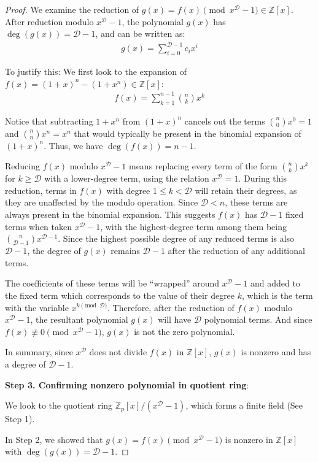 \documentclass{article}
\theoremstyle{plain}
\theoremstyle{definition}
\newcommand{\D}{\mathcal{D}}
\begin{document}
\begin{proof}
We examine the reduction of $g(x) = f(x) \pmod{x^{\D}-1} \in \mathbb{Z}[x]$. After reduction modulo $x^\D - 1$, the polynomial $g(x)$ has $\deg(g(x)) = \D-1$, and can be written as:
\begin{align}
    g(x) = \sum_{i=0}^{\D-1} c_i x^i
\end{align}

To justify this: We first look to the expansion of  $f(x) = (1 + x)^n - (1 + x^n) \in \mathbb{Z}[x]$:
\begin{align}
    f(x) = \sum_{k=1}^{n-1} \binom{n}{k} x^k
\end{align}

Notice that subtracting $1+x^n$ from $(1+x)^n$ cancels out the terms $\binom{n}{0} x^0 = 1$ and $\binom{n}{n} x^n = x^n$ that would typically be present in the binomial expansion of $(1+x)^n$. Thus, we have $\deg(f(x))=n-1$.

Reducing $f(x)$ modulo $x^{\D} - 1$ means replacing every term of the form $\binom{n}{k} x^k$ for $k \geq \D$ with a lower-degree term, using the relation $x^\D = 1$. During this reduction, terms in $f(x)$ with degree $1 \leq k < \D$ will retain their degrees, as they are unaffected by the modulo operation. Since $\D < n$, these terms are always present in the binomial expansion. This suggests $f(x)$ has $\D-1$ fixed terms when taken $x^\D - 1$,  with the highest-degree term among them being $\binom{n}{\D-1} x^{\D-1}$. Since the highest possible degree of any reduced terms is also $\D-1$, the degree of $g(x)$ remains $\D-1$ after the reduction of any additional terms.

The coefficients of these terms will be ``wrapped'' around $x^\D - 1$ and added to the fixed term which corresponds to the value of their degree $k$, which is the term with the variable $x^{k \pmod{\D}}$. Therefore, after the reduction of $f(x)$ modulo $x^\D - 1$, the resultant polynomial $g(x)$ will have $\D$ polynomial terms. And since $f(x) \not\equiv 0 \pmod{x^\D - 1}$, $g(x)$ is not the zero polynomial.

In summary, since $x^\D $ does not divide $f(x)$ in $\mathbb{Z}[x]$, $g(x)$ is nonzero and has a degree of $\D-1$.

\textbf{Step 3. Confirming nonzero polynomial in quotient ring}:

We look to the quotient ring $\mathbb{Z}_p[x]/(x^{\D} - 1)$, which forms a finite field (See Step 1).

In Step 2, we showed that $g(x) = f(x) \pmod{x^{\D} - 1}$ is nonzero in $\mathbb{Z}[x]$ with $\deg(g(x)) = \D-1$.


\end{proof}
\end{document}
